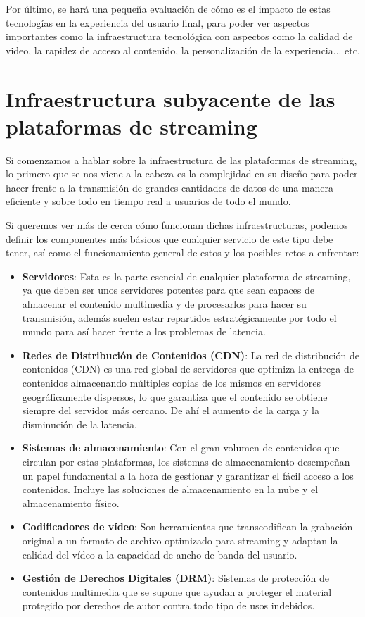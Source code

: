 \documentclass[12pt,a4paper]{article}
\begin{document}
Por último, se hará una pequeña evaluación de cómo es el impacto de estas tecnologías en la experiencia del usuario final, para poder ver aspectos importantes como la infraestructura tecnológica con aspectos como la calidad de video, la rapidez de acceso al contenido, la personalización de la experiencia... etc.

\newpage


\section{Infraestructura subyacente de las plataformas de streaming}
Si comenzamos a hablar sobre la infraestructura de las plataformas de streaming, lo primero que se nos viene a la cabeza es la complejidad en su diseño para poder hacer frente a la transmisión de grandes cantidades de datos de una manera eficiente y sobre todo en tiempo real a usuarios de todo el mundo.

Si queremos ver más de cerca cómo funcionan dichas infraestructuras, podemos definir los componentes más básicos que cualquier servicio de este tipo debe tener, así como el funcionamiento general de estos y los posibles retos a enfrentar:

\begin{itemize}
    \item \textbf{Servidores}: Esta es la parte esencial de cualquier plataforma de streaming, ya que deben ser unos servidores potentes para que sean capaces de almacenar el contenido multimedia y de procesarlos para hacer su transmisión, además suelen estar repartidos estratégicamente por todo el mundo para así hacer frente a los problemas de latencia.
    \item \textbf{Redes de Distribución de Contenidos (CDN)}: La red de distribución de contenidos (CDN) es una red global de servidores que optimiza la entrega de contenidos almacenando múltiples copias de los mismos en servidores geográficamente dispersos, lo que garantiza que el contenido se obtiene siempre del servidor más cercano. De ahí el aumento de la carga y la disminución de la latencia.
    \item \textbf{Sistemas de almacenamiento}: Con el gran volumen de contenidos que circulan por estas plataformas, los sistemas de almacenamiento desempeñan un papel fundamental a la hora de gestionar y garantizar el fácil acceso a los contenidos. Incluye las soluciones de almacenamiento en la nube y el almacenamiento físico.
    \item \textbf{Codificadores de vídeo}: Son herramientas que transcodifican la grabación original a un formato de archivo optimizado para streaming y adaptan la calidad del vídeo a la capacidad de ancho de banda del usuario.
    \item \textbf{Gestión de Derechos Digitales (DRM)}: Sistemas de protección de contenidos multimedia que se supone que ayudan a proteger el material protegido por derechos de autor contra todo tipo de usos indebidos.
\end{itemize}
\end{document}
